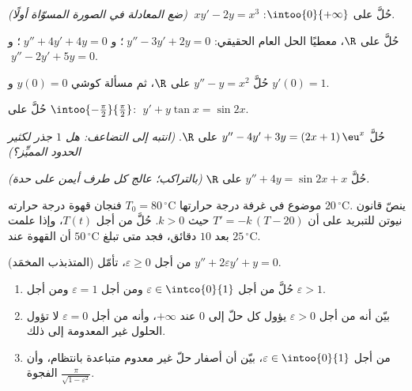 \begin{exercise}[$\star$]\label{exo:b1:diffeq:2}
حُلَّ على $\intoo{0}{+\infty}$: $\;x y' - 2y = x^3$ \emph{(ضع
المعادلة في الصورة المسوّاة أولًا)}.
\end{exercise}

\begin{exercise}[$\star$]\label{exo:b1:diffeq:3}
حُلَّ على $\R$، معطيًا الحل العام الحقيقي:
$\;y'' - 3y' + 2y = 0$؛ و $\;y'' + 4y' + 4y = 0$؛ و$\;y'' - 2y' + 5y =
0$.
\end{exercise}

\begin{exercise}[$\star$]\label{exo:b1:diffeq:4}
حُلَّ $y'' - y = x^2$ على $\R$، ثم مسألة كوشي $y(0) = 0$ و
$y'(0) = 1$.
\end{exercise}

\begin{exercise}[$\star\star$]\label{exo:b1:diffeq:5}
حُلَّ على $\intoo{-\frac\pi2}{\frac\pi2}$:
$\;y' + y\tan x = \sin 2x$.
\end{exercise}

\begin{exercise}[$\star\star$]\label{exo:b1:diffeq:6}
حُلَّ $y'' - 4y' + 3y = (2x + 1)\,\eu^{x}$ على $\R$. \emph{(انتبه إلى
التضاعف: هل $1$ جذر لكثير الحدود المميِّز؟)}
\end{exercise}

\begin{exercise}[$\star\star$]\label{exo:b1:diffeq:7}
حُلَّ $y'' + 4y = \sin 2x + x$ على $\R$ \emph{(بالتراكب؛ عالج
كل طرف أيمن على حدة)}.
\end{exercise}

\begin{exercise}[$\star\star$]\label{exo:b1:diffeq:8}
فنجان قهوة درجة حرارته $T_0 = 80\,^\circ$C موضوع في غرفة درجة
حرارتها $20\,^\circ$C. ينصّ قانون نيوتن للتبريد على أن $T' = -k\,(T - 20)$ حيث
$k > 0$. حُلَّ من أجل $T(t)$، وإذا علمت أن القهوة عند
$50\,^\circ$C بعد $10$ دقائق، فجد متى تبلغ
$25\,^\circ$C.
\end{exercise}

\begin{exercise}[$\star\star\star$]\label{exo:b1:diffeq:9}
(المتذبذب المخمَد) من أجل $\varepsilon \geq 0$، تأمّل
$y'' + 2\varepsilon y' + y = 0$.
\begin{enumerate}
  \item حُلَّ من أجل $\varepsilon \in \intco{0}{1}$ ومن أجل $\varepsilon = 1$
        ومن أجل $\varepsilon > 1$.
  \item بيّن أنه من أجل $\varepsilon > 0$ يؤول كل حلّ إلى $0$
        عند $+\infty$، وأنه من أجل $\varepsilon = 0$ لا تؤول
        الحلول غير المعدومة إلى ذلك.
  \item من أجل $\varepsilon \in \intoo{0}{1}$، بيّن أن أصفار حلّ غير
        معدوم متباعدة بانتظام، وأن الفجوة
        $\frac{\pi}{\sqrt{1 - \varepsilon^2}}$.
\end{enumerate}
\end{exercise}


